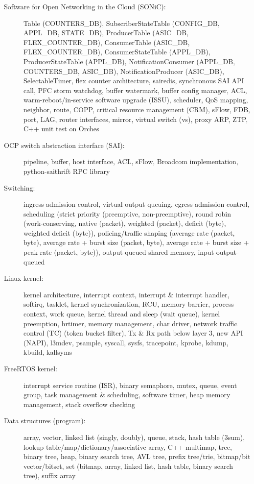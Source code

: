\documentclass[letterpaper,11pt]{article}
\begin{document}
\begin{CJK}{UTF8}{gbsn}
\begin{description}
\item[Software for Open Networking in the Cloud (SONiC):] Table (COUNTERS\_DB), SubscriberStateTable (CONFIG\_DB, APPL\_DB, STATE\_DB),
ProducerTable (ASIC\_DB, FLEX\_COUNTER\_DB), ConsumerTable (ASIC\_DB, FLEX\_COUNTER\_DB),
%
ConsumerStateTable (APPL\_DB), ProducerStateTable (APPL\_DB),
%
NotificationConsumer (APPL\_DB, COUNTERS\_DB, ASIC\_DB), NotificationProducer (ASIC\_DB),
SelectableTimer,
%
flex counter architecture, sairedis, synchronous SAI API call, PFC storm watchdog,
buffer watermark, buffer config manager, ACL, warm-reboot/in-service software upgrade (ISSU), scheduler, QoS mapping,
neighbor, route, COPP, critical resource management (CRM), sFlow, FDB, port, LAG, router interfaces, mirror,
virtual switch (vs), proxy ARP, ZTP, C++ unit test on Orches

\item[OCP switch abstraction interface (SAI):] pipeline, buffer, host interface, ACL, sFlow,
Broadcom implementation, python-saithrift RPC library

\item[Switching:] ingress admission control, virtual output queuing, egress admission control,
scheduling (strict priority (preemptive, non-preemptive),
round robin (work-conserving, native (packet), weighted (packet), deficit (byte), weighted deficit (byte)),
policing/traffic shaping (average rate (packet, byte), average rate + burst size (packet, byte), average rate + burst size + peak rate (packet, byte)),
output-queued shared memory, input-output-queued

\item[Linux kernel:] kernel architecture, interrupt context, interrupt \& interrupt handler, softirq, tasklet, kernel synchronization,
RCU, memory barrier, process context, work queue, kernel thread and sleep (wait queue), kernel preemption, hrtimer, memory management,
char driver, network traffic control (TC) (token bucket filter), Tx \& Rx path below layer 3, new API (NAPI), l3mdev, psample,
syscall, sysfs, tracepoint, kprobe, kdump, kbuild, kallsyms

\item[FreeRTOS kernel:] interrupt service routine (ISR), binary semaphore, mutex, queue, event group, task management \& scheduling, software timer,
heap memory management, stack overflow checking

\item[Data structures (program):] array, vector, linked list (singly, doubly), queue, stack,
hash table (3sum), lookup table/map/dictionary/associative array, C++ multimap,
tree, binary tree, heap, binary search tree, AVL tree, prefix tree/trie,
bitmap/bit vector/bitset, set (bitmap, array, linked list, hash table, binary search tree),
suffix array


\end{description}
\end{CJK}
\end{document}
